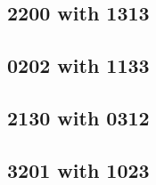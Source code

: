 \subsection{2200 with 1313}


 \begin{center}




 \end{center}



\subsection{0202 with 1133}


 \begin{center}




 \end{center}



\subsection{2130 with 0312}


 \begin{center}




 \end{center}



\subsection{3201 with 1023}


